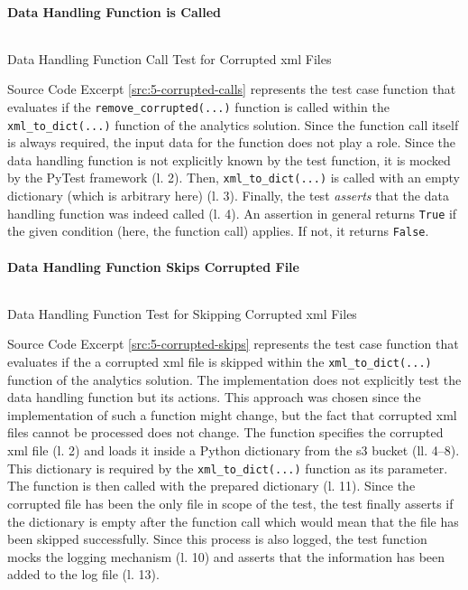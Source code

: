 \paragraph{Data Handling Function is Called}
\begin{listing}[h!]
	\inputminted{python}{main-matter/src/5-corrupted-calls.py}
	\caption{Data Handling Function Call Test for Corrupted \acs{xml} Files}
	\label{src:5-corrupted-calls}
\end{listing}
Source Code Excerpt \ref{src:5-corrupted-calls} represents the test case function that evaluates if the \texttt{remove\_corrupted(...)} function is called within the \texttt{xml\_to\_dict(...)} function of the analytics solution. Since the function call itself is always required, the input data for the function does not play a role. Since the data handling function is not explicitly known by the test function, it is mocked by the PyTest framework (l. 2). Then, \texttt{xml\_to\_dict(...)} is called with an empty dictionary (which is arbitrary here) (l. 3). Finally, the test \textit{asserts} that the data handling function was indeed called (l. 4). An assertion in general returns \texttt{True} if the given condition (here, the function call) applies. If not, it returns \texttt{False}. 
\newpage
\paragraph{Data Handling Function Skips Corrupted File}
\begin{listing}[h!]
	\inputminted{python}{main-matter/src/5-corrupted-skips.py}
	\caption{Data Handling Function Test for Skipping Corrupted \acs{xml} Files}
	\label{src:5-corrupted-skips}
\end{listing}
Source Code Excerpt \ref{src:5-corrupted-skips} represents the test case function that evaluates if the a corrupted \ac{xml} file is skipped within the \texttt{xml\_to\_dict(...)} function of the analytics solution. The implementation does not explicitly test the data handling function but its actions. This approach was chosen since the implementation of such a function might change, but the fact that corrupted \ac{xml} files cannot be processed does not change. The function specifies the corrupted \ac{xml} file (l. 2) and loads it inside a Python dictionary from the \ac{s3} bucket (ll. 4--8). This dictionary is required by the \texttt{xml\_to\_dict(...)} function as its parameter. The function is then called with the prepared dictionary (l. 11). Since the corrupted file has been the only file in scope of the test, the test finally asserts if the dictionary is empty after the function call which would mean that the file has been skipped successfully. Since this process is also logged, the test function mocks the logging mechanism (l. 10) and asserts that the information has been added to the log file (l. 13). 
\newpage
